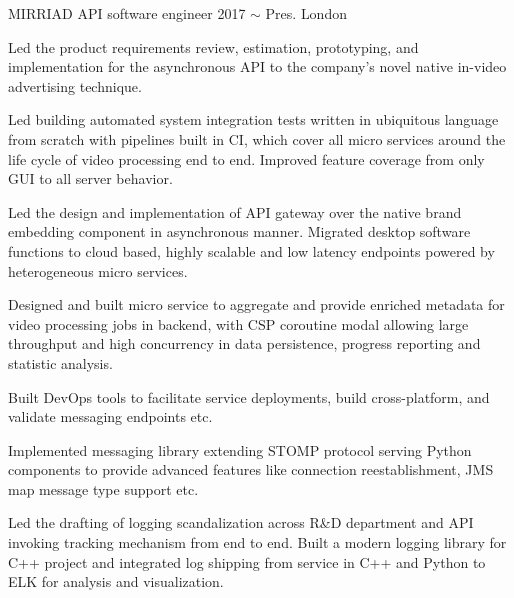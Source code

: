 \begin{cventries}
  \cventry
    {MIRRIAD}
    {API software engineer}
    {2017 $\sim$ Pres.}
    {London}
    {
      \begin{cvitems}
        \item {Led the product requirements review, estimation, prototyping, and implementation for the asynchronous API to the company's novel native in-video advertising technique.}
        \item {Led building automated system integration tests written in ubiquitous language from scratch with pipelines built in CI, which cover all micro services around the life cycle of video processing end to end. Improved feature coverage from only GUI to all server behavior.}
        \item {Led the design and implementation of API gateway over the native brand embedding component in asynchronous manner. Migrated desktop software functions to cloud based, highly scalable and low latency endpoints powered by heterogeneous micro services.}
        \item {Designed and built micro service to aggregate and provide enriched metadata for video processing jobs in backend, with CSP coroutine modal allowing large throughput and high concurrency in data persistence, progress reporting and statistic analysis.}
        \item {Built DevOps tools to facilitate service deployments, build cross-platform, and validate messaging endpoints etc.}
        \item {Implemented messaging library extending STOMP protocol serving Python components to provide advanced features like connection reestablishment, JMS map message type support etc.}
        \item {Led the drafting of logging scandalization across R\&D department and API invoking tracking mechanism from end to end. Built a modern logging library for C++ project and integrated log shipping from service in C++ and Python to ELK for analysis and visualization.}
      \end{cvitems}
    }
    \begin{flushleft}
    \end{flushleft}


\end{cventries}
